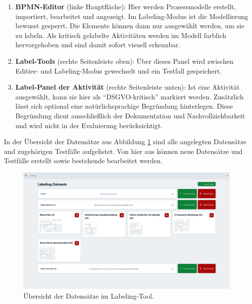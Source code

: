 \begin{enumerate}
    \item \textbf{BPMN-Editor} (linke Hauptfläche): Hier werden Prozessmodelle erstellt, importiert, bearbeitet und angezeigt. Im Labeling-Modus ist die Modellierung bewusst gesperrt. Die Elemente können dann nur ausgewählt werden, um sie zu labeln. Als kritisch gelabelte Aktivitäten werden im Modell farblich hervorgehoben und sind damit sofort visuell erkennbar.
    \item \textbf{Label-Tools} (rechte Seitenleiste oben): Über dieses Panel wird zwischen Editier- und Labeling-Modus gewechselt und ein Testfall gespeichert.
    \item \textbf{Label-Panel der Aktivität} (rechte Seitenleiste unten): Ist eine Aktivität ausgewählt, kann sie hier als \enquote{DSGVO-kritisch} markiert werden. Zusätzlich lässt sich optional eine natürlichsprachige Begründung hinterlegen. Diese Begründung dient ausschließlich der Dokumentation und Nachvollziehbarkeit und wird nicht in der Evaluierung berücksichtigt.
\end{enumerate}

In der Übersicht der Datensätze aus Abbildung \ref{fig:labeling-datasets} sind alle angelegten Datensätze und zugehörigen Testfälle aufgelistet. Von hier aus können neue Datensätze und Testfälle erstellt sowie bestehende bearbeitet werden.

\begin{figure}
    \centering
    \includegraphics[width=\textwidth]{images/labeling/labeling-datasets}
    \caption{Übersicht der Datensätze im Labeling-Tool.}
    \label{fig:labeling-datasets}
\end{figure}